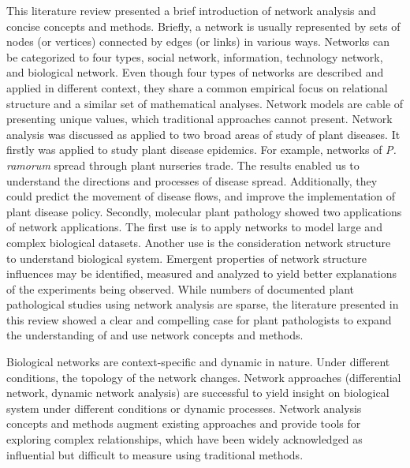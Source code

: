 This literature review presented a brief introduction of network analysis and concise concepts and methods. Briefly, a network is usually represented by sets of nodes (or vertices) connected by edges (or links) in various ways. Networks can be categorized to four types, social network, information, technology network, and biological network. Even though four types of networks are described and applied in different context, they share a common empirical focus on relational structure and a similar set of mathematical analyses. Network models are cable of presenting unique values, which traditional approaches cannot present. Network analysis was discussed as applied to two broad areas of study of plant diseases. It firstly was applied to study plant disease epidemics. For example, networks of \textit{P. ramorum} spread through plant nurseries trade. The results enabled us to understand the directions and processes of disease spread. Additionally, they could predict the movement of disease flows, and improve the implementation of plant disease policy. Secondly, molecular plant pathology showed two applications of network applications. The first use is to apply networks to model large and complex biological datasets. Another use is the consideration network structure to understand biological system. Emergent properties of network structure influences may be identified, measured and analyzed to yield better explanations of the experiments being observed. While numbers of documented plant pathological studies using network analysis are sparse, the literature presented in this review showed a clear and compelling case for plant pathologists to expand the understanding of and use network concepts and methods.

Biological networks are context-specific and dynamic in nature. Under different conditions, the topology of the network changes. Network approaches (differential network, dynamic network analysis) are successful to yield insight on biological system under different conditions or dynamic processes. Network analysis concepts and methods augment existing approaches and provide tools for exploring complex relationships, which have been widely acknowledged as influential but difficult to measure using traditional methods. 



